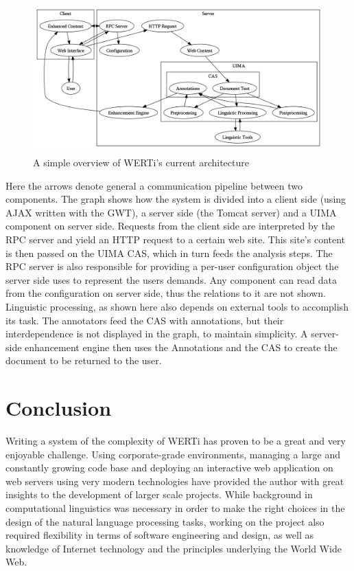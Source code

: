 \documentclass[12pt]{scrartcl}
\begin{document}
\begin{figure}[htp]\label{digraph}
  \centering
  \includegraphics[scale=0.45,angle=90]{architecture}
  \caption{A simple overview of WERTi's current architecture}
\end{figure}

Here the arrows denote general a communication pipeline between two components. The
graph shows how the system is divided into a client side (using AJAX written
with the GWT), a server side (the Tomcat server) and a UIMA component on server
side. Requests from the client side are interpreted by the RPC server and yield
an HTTP request to a certain web site. This site's content is then passed on the
UIMA CAS, which in turn feeds the analysis steps. The RPC server is also
responsible for providing a per-user configuration object the server side uses
to represent the users demands. Any component can read data from the
configuration on server side, thus the relations to it are not shown. Linguistic processing, as
shown here also depends on external tools to accomplish its task. The annotators
feed the CAS with annotations, but their interdependence is not displayed in the
graph, to maintain simplicity. A server-side enhancement engine then uses the
Annotations and the CAS to create the document to be returned to the user.

\section{Conclusion}

Writing a system of the complexity of WERTi has proven to be a great and very
enjoyable challenge. Using corporate-grade environments, managing a large and
constantly growing code base and deploying an interactive web application on web
servers using very modern technologies have provided the author with great
insights to the development of larger scale projects. While background in
computational linguistics was necessary in order to make the right choices in
the design of the natural language processing tasks, working on the project also
required flexibility in terms of software engineering and design, as well as
knowledge of Internet technology and the principles underlying the World Wide
Web.
\end{document}
